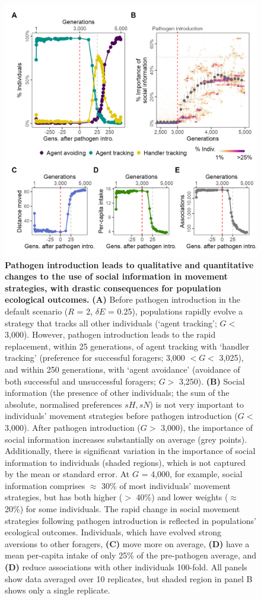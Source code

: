 \begin{figure}[!h]
    \centering
    \includegraphics[width=0.7\linewidth]{figures/pathomove/fig_01.png}
    \caption{
        \textbf{Pathogen introduction leads to qualitative and quantitative changes to the use of social information in movement strategies, with drastic consequences for population ecological outcomes.}
        \textbf{(A)} Before pathogen introduction in the default scenario ($R$ = 2, $\delta E$ = 0.25), populations rapidly evolve a strategy that tracks all other individuals (`agent tracking'; $G <$ 3,000).
        However, pathogen introduction leads to the rapid replacement, within 25 generations, of agent tracking with `handler tracking' (preference for successful foragers; 3,000 $< G <$ 3,025), and within 250 generations, with `agent avoidance' (avoidance of both successful and unsuccessful foragers; $G >$ 3,250).
        \textbf{(B)} Social information (the presence of other individuals; the sum of the absolute, normalised preferences $sH, sN$) is not very important to individuals' movement strategies before pathogen introduction ($G <$ 3,000).
        After pathogen introduction ($G >$ 3,000), the importance of social information increases substantially on average (grey points).
        Additionally, there is significant variation in the importance of social information to individuals (shaded regions), which is not captured by the mean or standard error.
        At $G$ = 4,000, for example, social information comprises $\approx$ 30\% of most individuals' movement strategies, but has both higher ($>$ 40\%) and lower weights ($\approx$ 20\%) for some individuals.
        The rapid change in social movement strategies following pathogen introduction is reflected in populations' ecological outcomes.
        Individuals, which have evolved strong aversions to other foragers, \textbf{(C)} move more on average, \textbf{(D)} have a mean per-capita intake of only 25\% of the pre-pathogen average, and \textbf{(D)} reduce associations with other individuals 100-fold.
        All panels show data averaged over 10 replicates, but shaded region in panel B shows only a single replicate.
    }
    \label{patho_fig_01}
\end{figure}


